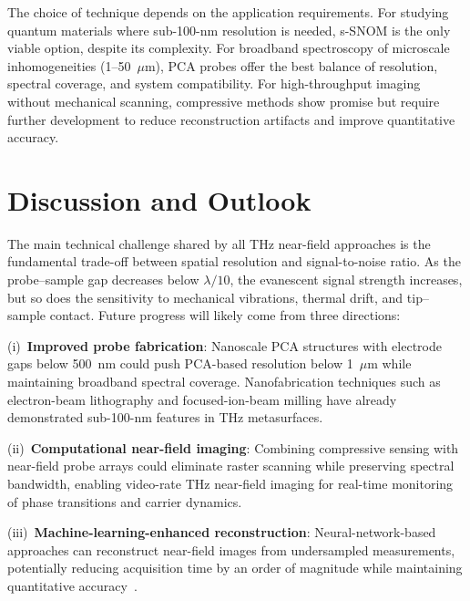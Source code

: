 \documentclass[reprint,superscriptaddress,amsmath,amssymb]{revtex4-2}
\begin{document}
The choice of technique depends on the application requirements. For studying quantum materials where sub-100-nm resolution is needed, s-SNOM is the only viable option, despite its complexity. For broadband spectroscopy of microscale inhomogeneities (1--50~$\mu$m), PCA probes offer the best balance of resolution, spectral coverage, and system compatibility. For high-throughput imaging without mechanical scanning, compressive methods show promise but require further development to reduce reconstruction artifacts and improve quantitative accuracy.

\section{Discussion and Outlook}
\label{sec:discussion}

The main technical challenge shared by all THz near-field approaches is the fundamental trade-off between spatial resolution and signal-to-noise ratio. As the probe--sample gap decreases below $\lambda/10$, the evanescent signal strength increases, but so does the sensitivity to mechanical vibrations, thermal drift, and tip--sample contact. Future progress will likely come from three directions:

(i)~\textbf{Improved probe fabrication}: Nanoscale PCA structures with electrode gaps below 500~nm could push PCA-based resolution below 1~$\mu$m while maintaining broadband spectral coverage. Nanofabrication techniques such as electron-beam lithography and focused-ion-beam milling have already demonstrated sub-100-nm features in THz metasurfaces.

(ii)~\textbf{Computational near-field imaging}: Combining compressive sensing with near-field probe arrays could eliminate raster scanning while preserving spectral bandwidth, enabling video-rate THz near-field imaging for real-time monitoring of phase transitions and carrier dynamics.

(iii)~\textbf{Machine-learning-enhanced reconstruction}: Neural-network-based approaches can reconstruct near-field images from undersampled measurements, potentially reducing acquisition time by an order of magnitude while maintaining quantitative accuracy~\cite{Zhu2025}.
\end{document}
